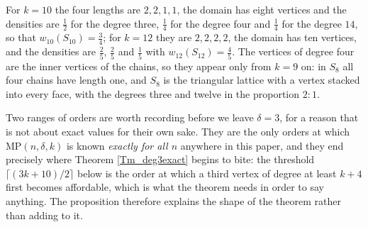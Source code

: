 \documentclass[10pt,a4paper]{article}
\begin{document}
For $k=10$ the four lengths are $2,2,1,1$, the domain has eight vertices and the densities are
$\frac{1}{2}$ for the degree three, $\frac{1}{4}$ for the degree four and $\frac{1}{4}$ for the
degree $14$, so that $w_{10}(S_{10})=\frac{3}{4}$; for $k=12$ they are $2,2,2,2$, the domain has ten
vertices, and the densities are $\frac{2}{5}$, $\frac{2}{5}$ and $\frac{1}{5}$ with
$w_{12}(S_{12})=\frac{4}{5}$. The vertices of degree four are the inner vertices of the chains, so
they appear only from $k=9$ on: in $S_{8}$ all four chains have length one, and $S_{8}$ is the
triangular lattice with a vertex stacked into every face, with the degrees three and twelve in the
proportion $2{:}1$.





Two ranges of orders are worth recording before we leave $\delta =3$, for a reason that is not about
exact values for their own sake. They are the only orders at which $\mathrm{MP}(n,\delta ,k)$ is known
\emph{exactly for all $n$} anywhere in this paper, and they end precisely where Theorem
\ref{Tm_deg3exact} begins to bite: the threshold $\lceil (3k+10)/2\rceil $ below is the order at which a
third vertex of degree at least $k+4$ first becomes affordable, which is what the theorem needs in order to
say anything. The proposition therefore explains the shape of the theorem rather than adding to it.
\end{document}
